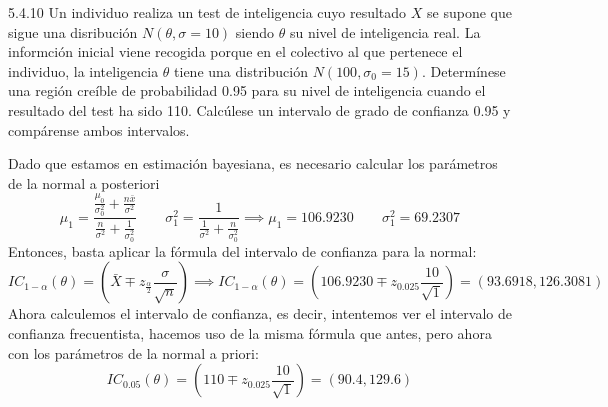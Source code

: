 \begin{problem}{5.4.10}
    Un individuo realiza un test de inteligencia cuyo resultado $X$ se supone que sigue una disribución $N(\theta, \sigma = 10)$ siendo $\theta$ su nivel de inteligencia real. La informción inicial viene recogida porque en el colectivo al que pertenece el individuo, la inteligencia $\theta$ tiene una distribución $N(100, \sigma_0 = 15)$. Determínese una región creíble de probabilidad 0.95 para su nivel de inteligencia cuando el resultado del test ha sido 110. Calcúlese un intervalo de grado de confianza 0.95 y compárense ambos intervalos. 
\end{problem}
\begin{sol}
    Dado que estamos en estimación bayesiana, es necesario calcular los parámetros de la normal a posteriori
    $$\mu_1 = \frac{\frac{\mu_0}{\sigma_0^2} + \frac{n\bar{x}}{\sigma^2}}{\frac{n}{\sigma^2} + \frac{1}{\sigma_0^2}} \quad \quad \sigma_1^2 = \frac{1}{\frac{1}{\sigma^2} + \frac{n}{\sigma_0^2}} \implies \mu_1 = 106.9230 \quad \quad \sigma_1^2 = 69.2307$$
    Entonces, basta aplicar la fórmula del intervalo de confianza para la normal: 
    $$IC_{1 - \alpha}(\theta) = \left(\bar{X} \mp z_{\frac{\alpha}{2}}\frac{\sigma}{\sqrt{n}}\right) \implies IC_{1 - \alpha}(\theta) = \left(106.9230 \mp z_{0.025}\frac{10}{\sqrt{1}}\right) = (93.6918, 126.3081)$$
    Ahora calculemos el intervalo de confianza, es decir, intentemos ver el intervalo de confianza frecuentista, hacemos uso de la misma fórmula que antes, pero ahora con los parámetros de la normal a priori:
    $$IC_{0.05}(\theta) = (110 \mp z_{0.025}\frac{10}{\sqrt{1}}) = (90.4, 129.6)$$
\end{sol}